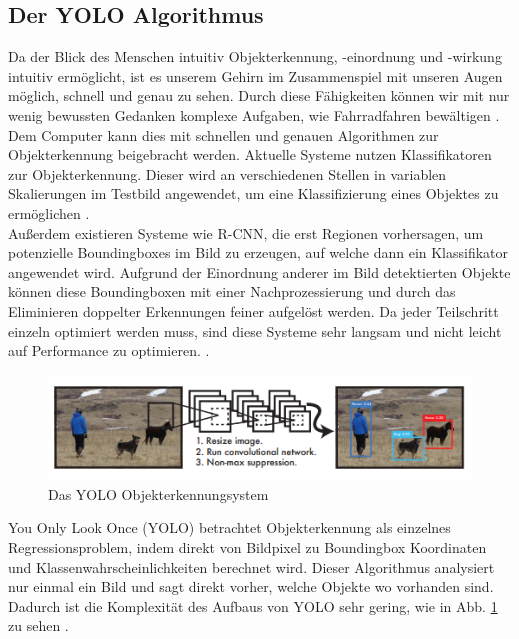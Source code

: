 {	\subsection{Der YOLO Algorithmus \label{subsec:YOLO_Alg}} 
	{Da der Blick des Menschen intuitiv Objekterkennung, -einordnung und -wirkung intuitiv ermöglicht, ist es unserem Gehirn im Zusammenspiel mit unseren Augen möglich, schnell und genau zu sehen. Durch diese Fähigkeiten können wir mit nur wenig bewussten Gedanken komplexe Aufgaben, wie Fahrradfahren bewältigen \citep{Redmon2016}. \\
	Dem Computer kann dies mit schnellen und genauen Algorithmen zur Objekterkennung beigebracht werden. Aktuelle Systeme nutzen Klassifikatoren zur Objekterkennung. Dieser wird an verschiedenen Stellen in variablen Skalierungen im Testbild angewendet, um eine Klassifizierung eines Objektes zu ermöglichen \citep{Redmon2016}. \\ 
	Außerdem existieren Systeme wie R-CNN, die erst Regionen vorhersagen, um potenzielle Boundingboxes im Bild zu erzeugen, auf welche dann ein Klassifikator angewendet wird. Aufgrund der Einordnung anderer im Bild detektierten Objekte können diese Boundingboxen mit einer Nachprozessierung und durch das Eliminieren doppelter Erkennungen feiner aufgelöst werden. Da jeder Teilschritt einzeln optimiert werden muss, sind diese Systeme sehr langsam und nicht leicht auf Performance zu optimieren. \citep{Redmon2016}. \\
	\begin{figure}[ht]
		\centering
		\includegraphics*[scale = 1, keepaspectratio, trim=2 2 2 2 ]{images/YOLO/YOLO_detection_system.png}
		\caption[Das YOLO Objekterkennungsystem]{Das YOLO Objekterkennungsystem \citep{Redmon2016}}
		\label{YOLO_Objectdetection}
 	\end{figure}
	\glqq You Only Look Once\grqq{} (YOLO) betrachtet Objekterkennung als einzelnes Regressionsproblem, indem direkt von Bildpixel zu Boundingbox Koordinaten und Klassenwahrscheinlichkeiten berechnet wird. Dieser Algorithmus analysiert nur einmal ein Bild und sagt direkt vorher, welche Objekte wo vorhanden sind. Dadurch ist die Komplexität des  Aufbaus von YOLO sehr gering, wie in Abb. \ref{YOLO_Objectdetection} zu sehen \citep{Redmon2016}. \\
}}
